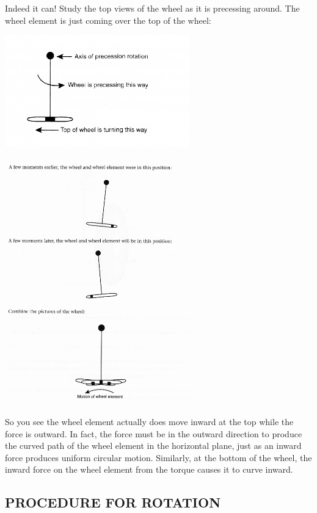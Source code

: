 Indeed it can!  Study the top views of the wheel as it is precessing around.  The wheel element is just coming over the top of the wheel:
\begin{center} \includegraphics*[width=0.6\textwidth]{imgs/6labs/6Alab/6Aexp7/diagaram1_sm.png} \end{center}
\begin{center} \includegraphics*[width=0.6\textwidth]{imgs/6labs/6Alab/6Aexp7/diagram2_sm.png} \end{center}
So you see the wheel element actually does move inward at the top while the force is outward.  In fact, the force must be in the outward direction to produce the curved path of the wheel element in the horizontal plane, just as an inward force produces uniform circular motion.  Similarly, at the bottom of the wheel, the inward force on the wheel element from the torque causes it to curve inward.

\subsection*{PROCEDURE FOR ROTATION}

